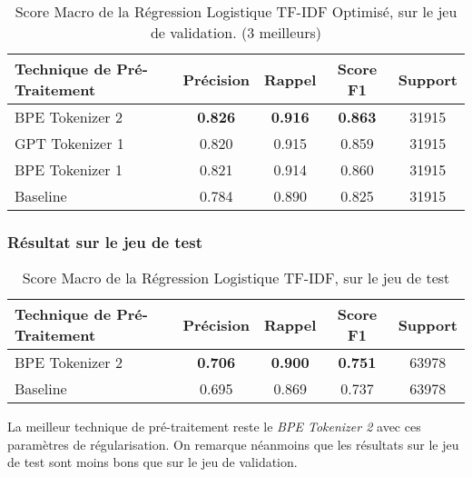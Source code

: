 \begin{table}[ht]
    \centering
    \caption{Score Macro de la Régression Logistique TF-IDF Optimisé, sur le jeu de validation. (3 meilleurs)}
    \begin{tabular}{lcccc}
    \hline
    \textbf{Technique de Pré-Traitement} & \textbf{Précision} & \textbf{Rappel} & \textbf{Score F1} & \textbf{Support} \\ \hline
    BPE Tokenizer 2                          & \textbf{0.826}              & \textbf{0.916}           & \textbf{0.863}             & 31915            \\
    GPT Tokenizer 1                          & 0.820              & 0.915           & 0.859             & 31915            \\
    BPE Tokenizer 1                           & 0.821              & 0.914           & 0.860             & 31915            \\ \hline
    Baseline             & 0.784             & 0.890           & 0.825             & 31915            \\ \hline
\end{tabular}
\label{tab:results}
\end{table}


\subsubsection{Résultat sur le jeu de test}
\begin{table}[ht]
    \centering
    \caption{Score Macro de la Régression Logistique TF-IDF, sur le jeu de test}
    \begin{tabular}{lcccc}
    \hline
    \textbf{Technique de Pré-Traitement} & \textbf{Précision} & \textbf{Rappel} & \textbf{Score F1} & \textbf{Support} \\ \hline
    BPE Tokenizer 2                          & \textbf{0.706}              & \textbf{0.900}           & \textbf{0.751}            & 63978            \\\hline
    Baseline                               & 0.695              & 0.869           & 0.737             & 63978            \\ \hline
\end{tabular}
\label{tab:results}
\end{table}
La meilleur technique de pré-traitement reste le \textit{BPE Tokenizer 2} avec ces paramètres de régularisation.
On remarque néanmoins que les résultats sur le jeu de test sont moins bons que sur le jeu de validation.

